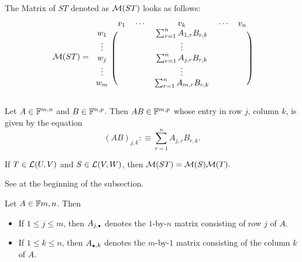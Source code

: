 The Matrix of $ST$ denoted as $\mathcal{M}(ST)$ looks as follows:
\begin{equation}
  \mathcal{M} (ST) =
  \begin{blockarray}{cccccc}
             & v_1 & \cdots &  v_k      & \cdots & v_n \\
    \begin{block}{c(ccccc)}
      w_1    &     &        &  
        \sum_{r=1}^{n} A_{1,r}  B_{r,k} &        &     \\
      \vdots &     &        &  \vdots   &        &     \\
      w_j    &     &        &  
        \sum_{r=1}^{n} A_{j,r}  B_{r,k} &        &     \\
      \vdots &     &        &  \vdots   &        &     \\
      w_m    &     &        &  
        \sum_{r=1}^{n} A_{m,r}  B_{r,k} &        &     \\
    \end{block}
  \end{blockarray}
\end{equation}

\setcounter{thm}{40}
\begin{mydef} 
  \label{def: matrix multiplication}
  Let $A \in \mathbb{F}^{m,n}$ and $B \in \mathbb{F}^{n,p}$. Then $AB \in \mathbb{F}^{m,p}$ whose entry in row $j$, column $k$, is given by the equation
  \begin{equation}
    (AB)_{j,k} :\equiv \sum_{r=1}^{n} A_{j,r} B_{r,k}.
  \end{equation} %
\end{mydef}

\setcounter{thm}{42}
\begin{thm}
  If $T \in \mathcal{L}(U,V)$ and $S\in \mathcal{L}(V,W)$, then $\mathcal{M}(ST) = \mathcal{M}(S) \mathcal{M}(T).$
\end{thm}
\begin{prf}
  See at the beginning of the subsection.
\end{prf}

\begin{mydef}  Let $A\in \mathbb{F}{m,n}$. Then
  \begin{itemize}
    \item If $1 \leq j \leq m$, then $A_{j, \mathsmaller{\bullet}}$ denotes the $1$-by-$n$ matrix consisting of row $j$ of $A$. 
    \item If $1 \leq k \leq n$, then  $A_{\mathsmaller{\bullet}, k}$ denotes the $m$-by-$1$ matrix consisting of the column $k$ of $A$.
  \end{itemize}
\end{mydef}

